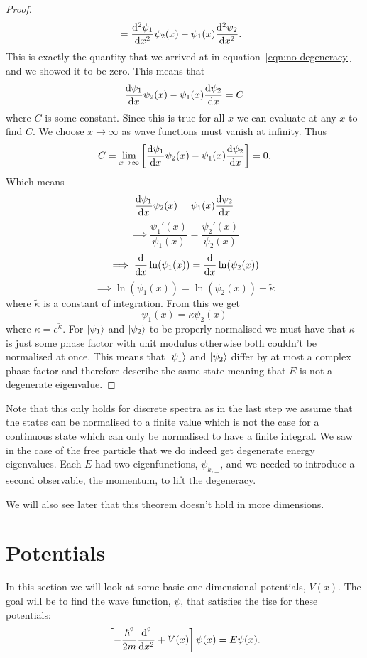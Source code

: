 \begin{proof}
\begin{align*}
            &= \dv[2]{\psi_1}{x}\psi_2(x) - \psi_1(x)\dv[2]{\psi_2}{x}.
        \end{align*}
        This is exactly the quantity that we arrived at in equation~\ref{eqn:no degeneracy} and we showed it to be zero.
        This means that
        \[\dv{\psi_1}{x}\psi_2(x) - \psi_1(x)\dv{\psi_2}{x} = C\]
        where \(C\) is some constant.
        Since this is true for all \(x\) we can evaluate at any \(x\) to find \(C\).
        We choose \(x\to\infty\) as wave functions must vanish at infinity.
        Thus
        \[C = \lim_{x\to\infty} \left[\dv{\psi_1}{x}\psi_2(x) - \psi_1(x)\dv{\psi_2}{x}\right] = 0.\]
        Which means
        \[\dv{\psi_1}{x}\psi_2(x) = \psi_1(x)\dv{\psi_2}{x}\]
        \[\implies \frac{\psi_1'(x)}{\psi_1(x)} = \frac{\psi_2'(x)}{\psi_2(x)}\]
        \[\implies \dv{x} \ln(\psi_1(x)) = \dv{x} \ln(\psi_2(x))\]
        \[\implies \ln(\psi_1(x)) = \ln(\psi_2(x)) + \tilde{\kappa}\]
        where \(\tilde{\kappa}\) is a constant of integration.
        From this we get
        \[\psi_1(x) = \kappa\psi_2(x)\]
        where \(\kappa = e^{\tilde{\kappa}}\).
        For \(\vert {\psi_1} \rangle\) and \(\vert {\psi_2} \rangle\) to be properly normalised we must have that \(\kappa\) is just some phase factor with unit modulus otherwise both couldn't be normalised at once.
        This means that \(\vert {\psi_1} \rangle\) and \(\vert {\psi_2} \rangle\) differ by at most a complex phase factor and therefore describe the same state meaning that \(E\) is not a degenerate eigenvalue.
    \end{proof}
    Note that this only holds for discrete spectra as in the last step we assume that the states can be normalised to a finite value which is not the case for a continuous state which can only be normalised to have a finite integral.
    We saw in the case of the free particle that we do indeed get degenerate energy eigenvalues.
    Each \(E\) had two eigenfunctions, \(\psi_{k,\pm}\), and we needed to introduce a second observable, the momentum, to lift the degeneracy.
    
    We will also see later that this theorem doesn't hold in more dimensions.
    
    \section{Potentials}
    In this section we will look at some basic one-dimensional potentials, \(V(x)\).
    The goal will be to find the wave function, \(\psi\), that satisfies the \gls{tise} for these potentials:
    \[\left[-\frac{\hbar^2}{2m}\dv[2]{x} + V(x)\right]\psi(x) = E\psi(x).\]
    

